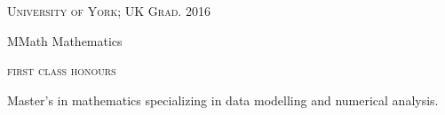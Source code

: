 \textsc{\small{University of York; UK
    \hfill
    {\raggedleft
        Grad. 2016
    }
}}

{\raggedright\large {
    MMath Mathematics
} \\}

\textsc{\small{first class honours}}

\normalsize{
    Master's in mathematics specializing in data modelling and numerical analysis.
} \\
